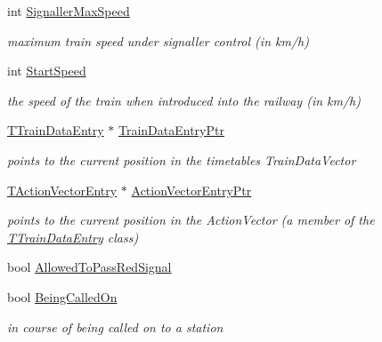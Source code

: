 \begin{DoxyCompactItemize}
int \mbox{\hyperlink{class_t_train_ad11759e49fa6fcf8367090ef1db490b7}{Signaller\+Max\+Speed}}
\begin{DoxyCompactList}\small\item\em maximum train speed under signaller control (in km/h) \end{DoxyCompactList}\item 
\mbox{\label{class_t_train_adae3a1fd82da0457a983a3ac41cdda3d}} 
int \mbox{\hyperlink{class_t_train_adae3a1fd82da0457a983a3ac41cdda3d}{Start\+Speed}}
\begin{DoxyCompactList}\small\item\em the speed of the train when introduced into the railway (in km/h) \end{DoxyCompactList}\item 
\mbox{\label{class_t_train_a28a2217abf201b23fd8b3b92c12038b7}} 
\mbox{\hyperlink{class_t_train_data_entry}{T\+Train\+Data\+Entry}} $\ast$ \mbox{\hyperlink{class_t_train_a28a2217abf201b23fd8b3b92c12038b7}{Train\+Data\+Entry\+Ptr}}
\begin{DoxyCompactList}\small\item\em points to the current position in the timetable\textquotesingle{}s Train\+Data\+Vector \end{DoxyCompactList}\item 
\mbox{\label{class_t_train_a1caacc95f3c31b0d6f71704eeee44a00}} 
\mbox{\hyperlink{class_t_action_vector_entry}{T\+Action\+Vector\+Entry}} $\ast$ \mbox{\hyperlink{class_t_train_a1caacc95f3c31b0d6f71704eeee44a00}{Action\+Vector\+Entry\+Ptr}}
\begin{DoxyCompactList}\small\item\em points to the current position in the Action\+Vector (a member of the \mbox{\hyperlink{class_t_train_data_entry}{T\+Train\+Data\+Entry}} class) \end{DoxyCompactList}\item 
bool \mbox{\hyperlink{class_t_train_a8c94580b79a8ad1ad0fce51f0abba822}{Allowed\+To\+Pass\+Red\+Signal}}
\item 
\mbox{\label{class_t_train_a33f0f08a95cc392557392d02e293c7c3}} 
bool \mbox{\hyperlink{class_t_train_a33f0f08a95cc392557392d02e293c7c3}{Being\+Called\+On}}
\begin{DoxyCompactList}\small\item\em in course of being called on to a station \end{DoxyCompactList}\item 

\end{DoxyCompactItemize}
